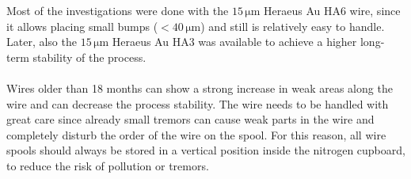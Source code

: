 Most of the investigations were done with the $15\,\si{\micro \meter}$ Heraeus Au HA6 wire, since it allows placing small bumps ($<40\,\si{\micro \meter}$) and still is relatively easy to handle. Later, also the $15\,\si{\micro \meter}$ Heraeus Au HA3 was available to achieve a higher long-term stability of the process.\\
\\Wires older than 18 months can show a strong increase in weak areas along the wire and can decrease the process stability. The wire needs to be handled with great care since already small tremors can cause weak parts in the wire and completely disturb the order of the wire on the spool. For this reason, all wire spools should always be stored in a vertical position inside the nitrogen cupboard, to reduce the risk of pollution or tremors.

